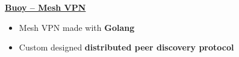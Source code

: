 \textbf{\href{https://github.com/prairir/Buoy}{Buoy -- Mesh VPN}} \par

\begin{itemize}
    \item Mesh VPN made with \textbf{Golang}
    \item Custom designed \textbf{distributed peer discovery protocol}
\end{itemize}
